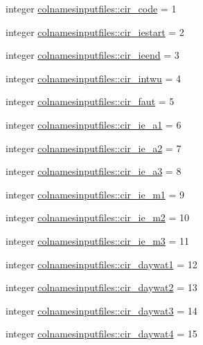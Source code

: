 \begin{DoxyCompactItemize}
integer \hyperlink{namespacecolnamesinputfiles_adea45bfc33129bf5236443899c32e784}{colnamesinputfiles\+::cir\+\_\+code} = 1
\item 
integer \hyperlink{namespacecolnamesinputfiles_aedb1a2816a743764a73427bebd396973}{colnamesinputfiles\+::cir\+\_\+iestart} = 2
\item 
integer \hyperlink{namespacecolnamesinputfiles_acd2a0cdb974d5b4d63f7f502d9f78541}{colnamesinputfiles\+::cir\+\_\+ieend} = 3
\item 
integer \hyperlink{namespacecolnamesinputfiles_afef2e6dbaa8a252249969847ad5858dd}{colnamesinputfiles\+::cir\+\_\+intwu} = 4
\item 
integer \hyperlink{namespacecolnamesinputfiles_a4be0e9c615eba874ad22cea1543dff7a}{colnamesinputfiles\+::cir\+\_\+faut} = 5
\item 
integer \hyperlink{namespacecolnamesinputfiles_ab603d829133c1cbc38395ecdace35747}{colnamesinputfiles\+::cir\+\_\+ie\+\_\+a1} = 6
\item 
integer \hyperlink{namespacecolnamesinputfiles_aef7752d703d6602e820229e44f312161}{colnamesinputfiles\+::cir\+\_\+ie\+\_\+a2} = 7
\item 
integer \hyperlink{namespacecolnamesinputfiles_a0b02c3639d0a4abfd4c56c80c591333f}{colnamesinputfiles\+::cir\+\_\+ie\+\_\+a3} = 8
\item 
integer \hyperlink{namespacecolnamesinputfiles_a5164fb838099ea449da9a7e488b7650d}{colnamesinputfiles\+::cir\+\_\+ie\+\_\+m1} = 9
\item 
integer \hyperlink{namespacecolnamesinputfiles_ac9392fc0678571c139cd8ce7c88fdf33}{colnamesinputfiles\+::cir\+\_\+ie\+\_\+m2} = 10
\item 
integer \hyperlink{namespacecolnamesinputfiles_ae68119ffcd136b14e9080045063bef16}{colnamesinputfiles\+::cir\+\_\+ie\+\_\+m3} = 11
\item 
integer \hyperlink{namespacecolnamesinputfiles_ae366ea7f91d46d7ae02adbaa72c69fc7}{colnamesinputfiles\+::cir\+\_\+daywat1} = 12
\item 
integer \hyperlink{namespacecolnamesinputfiles_a46ac814b1f9e3860eda8b2d3f8b98022}{colnamesinputfiles\+::cir\+\_\+daywat2} = 13
\item 
integer \hyperlink{namespacecolnamesinputfiles_a5fdc3e0318cb70a593a401c15baedb7a}{colnamesinputfiles\+::cir\+\_\+daywat3} = 14
\item 
integer \hyperlink{namespacecolnamesinputfiles_aa29df165330619d23581d35254047bc7}{colnamesinputfiles\+::cir\+\_\+daywat4} = 15
\item 

\end{DoxyCompactItemize}
